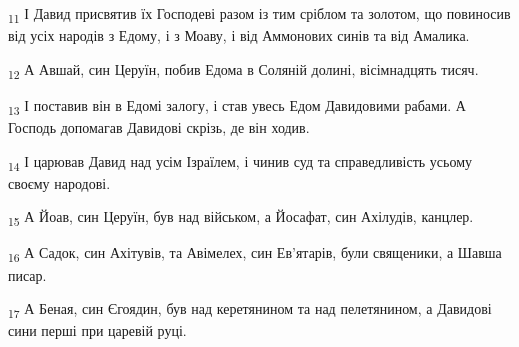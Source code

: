 \begin{tcolorbox}
\textsubscript{11} І Давид присвятив їх Господеві разом із тим сріблом та золотом, що повиносив від усіх народів з Едому, і з Моаву, і від Аммонових синів та від Амалика.
\end{tcolorbox}
\begin{tcolorbox}
\textsubscript{12} А Авшай, син Церуїн, побив Едома в Соляній долині, вісімнадцять тисяч.
\end{tcolorbox}
\begin{tcolorbox}
\textsubscript{13} І поставив він в Едомі залогу, і став увесь Едом Давидовими рабами. А Господь допомагав Давидові скрізь, де він ходив.
\end{tcolorbox}
\begin{tcolorbox}
\textsubscript{14} І царював Давид над усім Ізраїлем, і чинив суд та справедливість усьому своєму народові.
\end{tcolorbox}
\begin{tcolorbox}
\textsubscript{15} А Йоав, син Церуїн, був над військом, а Йосафат, син Ахілудів, канцлер.
\end{tcolorbox}
\begin{tcolorbox}
\textsubscript{16} А Садок, син Ахітувів, та Авімелех, син Ев'ятарів, були священики, а Шавша писар.
\end{tcolorbox}
\begin{tcolorbox}
\textsubscript{17} А Беная, син Єгоядин, був над керетянином та над пелетянином, а Давидові сини перші при царевій руці.
\end{tcolorbox}
